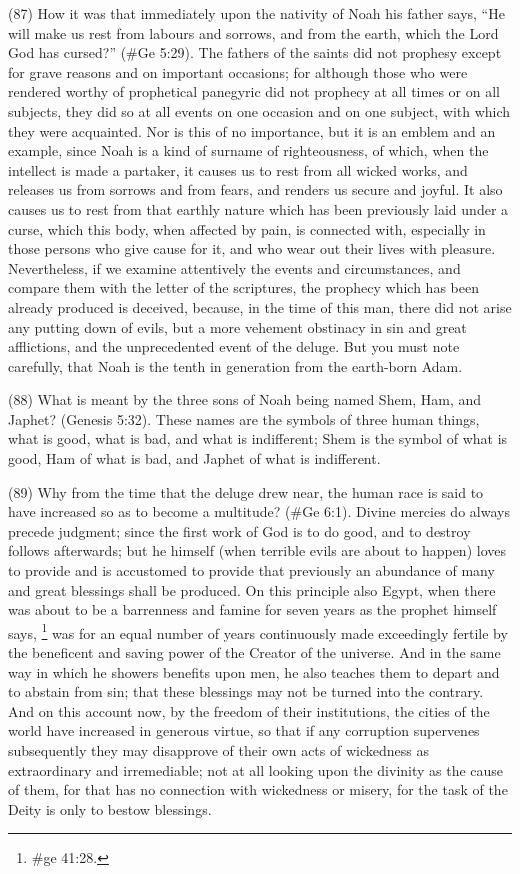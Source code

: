 (87) How it was that immediately upon the nativity of Noah his father says, ``He will make us rest
from labours and sorrows, and from the earth, which the Lord God has cursed?'' (\#Ge 5:29).
The fathers of the saints did not prophesy except for grave reasons and on important occasions;
for although those who were rendered worthy of prophetical panegyric did not prophecy at all times
or on all subjects, they did so at all events on one occasion and on one subject, with which they
were acquainted. Nor is this of no importance, but it is an emblem and an example, since Noah is a
kind of surname of righteousness, of which, when the intellect is made a partaker, it causes us to
rest from all wicked works, and releases us from sorrows and from fears, and renders us secure
and joyful. It also causes us to rest from that earthly nature which has been previously laid under a
curse, which this body, when affected by pain, is connected with, especially in those persons who
give cause for it, and who wear out their lives with pleasure. Nevertheless, if we examine
attentively the events and circumstances, and compare them with the letter of the scriptures, the
prophecy which has been already produced is deceived, because, in the time of this man, there did
not arise any putting down of evils, but a more vehement obstinacy in sin and great afflictions, and
the unprecedented event of the deluge. But you must note carefully, that Noah is the tenth in
generation from the earth-born Adam.

(88) What is meant by the three sons of Noah being named Shem, Ham, and Japhet? (Genesis
5:32). These names are the symbols of three human things, what is good, what is bad, and what is
indifferent; Shem is the symbol of what is good, Ham of what is bad, and Japhet of what is
indifferent.

(89) Why from the time that the deluge drew near, the human race is said to have increased so as
to become a multitude? (\#Ge 6:1). Divine mercies do always precede judgment; since the first
work of God is to do good, and to destroy follows afterwards; but he himself (when terrible evils are
about to happen) loves to provide and is accustomed to provide that previously an abundance of
many and great blessings shall be produced. On this principle also Egypt, when there was about to
be a barrenness and famine for seven years as the prophet himself says, \footnote{\#ge 41:28.} was for
an equal number of years continuously made exceedingly fertile by the beneficent and saving
power of the Creator of the universe. And in the same way in which he showers benefits upon men,
he also teaches them to depart and to abstain from sin; that these blessings may not be turned into
the contrary. And on this account now, by the freedom of their institutions, the cities of the world
have increased in generous virtue, so that if any corruption supervenes subsequently they may
disapprove of their own acts of wickedness as extraordinary and irremediable; not at all looking
upon the divinity as the cause of them, for that has no connection with wickedness or misery, for
the task of the Deity is only to bestow blessings.

